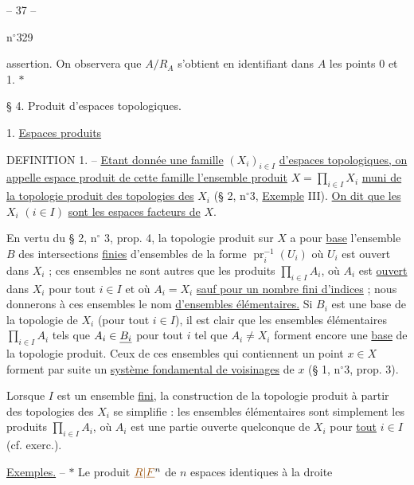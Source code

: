 \begin{center}-- 37 --\end{center}
\hfill n$^{\circ}$329

assertion. On observera que $A/R_A$ s'obtient en identifiant dans $A$ les points 0 et 1. $*$

\begin{center}§ 4. Produit d'espaces topologiques.\end{center}

1. \uline{Espaces produits}

DEFINITION 1. -- \uline{Etant donnée une famille} $(X_i)_{i\in I}$ \uline{d'espaces topologiques, on appelle espace produit de cette famille l'ensemble produit} $X=\prod_{i\in I}X_i$ \uline{muni de la topologie produit des topologies des} $X_i$ (§ 2, n$^{\circ}$3, \uline{Exemple} III). \uline{On dit que les} $X_i$ $(i\in I)$ \uline{sont les espaces facteurs de} $X$.

En vertu du § 2, n$^{\circ}$ 3, prop. 4, la topologie produit sur $X$ a pour \uline{base} l'ensemble \uline{$B$} des intersections \uline{finies} d'ensembles de la forme $\operatorname{pr}_i^{-1}(U_i)$ où $U_i$ est ouvert dans $X_i$ ; ces ensembles ne sont autres que les produits $\prod_{i\in I}A_i$, où $A_i$ est \uline{ouvert} dans $X_i$ pour tout $i\in I$ et où $A_i=X_i$ \uline{sauf pour un nombre fini d'indices} ; nous donnerons à ces ensembles le nom \uline{d'ensembles élémentaires.} Si \uline{$B_i$} est une base de la topologie de $X_i$ (pour tout $i\in I$), il est clair que les ensembles élémentaires $\prod_{i\in I}A_i$ tels que $A_i\in\text{\underline{$B_i$}}$ pour tout $i$ tel que $A_i\ne X_i$ forment encore une \uline{base} de la topologie produit. Ceux de ces ensembles qui contiennent un point $x\in X$ forment par suite un \uline{système fondamental de voisinages} de $x$ (§ 1, n$^{\circ}$3, prop. 3).

Lorsque $I$ est un ensemble \uline{fini}, la construction de la topologie produit à partir des topologies des $X_i$ se simplifie : les ensembles élémentaires sont simplement les produits $\prod_{i\in I}A_i$, où $A_i$ est une partie ouverte quelconque de $X_i$ pour \uline{tout} $i\in I$ (cf. exerc.\quad).

\uline{Exemples.} -- $*$ Le produit $\unsure{\text{\uline{$R$}}|\text{\uline{$F$}}}^n$ de $n$ espaces identiques à la droite
